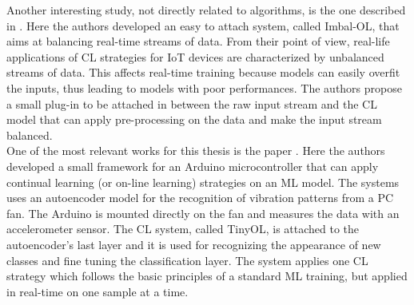 \documentclass[12pt]{report}
\begin{document}
Another interesting study, not directly related to algorithms, is the one described in \cite{sudharsan2021imbal}. Here the authors developed an easy to attach system, called Imbal-OL, that aims at balancing real-time streams of data. From their point of view, real-life applications of CL strategies for IoT devices are characterized by unbalanced streams of data. This affects real-time training because models can easily overfit the inputs, thus leading to models with poor performances. The authors propose a small plug-in to be attached in between the raw input stream and the CL model that can apply pre-processing on the data and make the input stream balanced. \\
One of the most relevant works for this thesis is the paper \cite{ren2021tinyol}. Here the authors developed a small framework for an Arduino microcontroller that can apply continual learning (or on-line learning) strategies on an ML model. The systems uses an autoencoder model for the recognition of vibration patterns from a PC fan. The Arduino is mounted directly on the fan and measures the data with an accelerometer sensor. The CL system, called TinyOL, is attached to the autoencoder's last layer and it is used for recognizing the appearance of new classes and fine tuning the classification layer. The system applies one CL strategy which follows the basic principles of a standard ML training, but applied in real-time on one sample at a time. 
\end{document}
